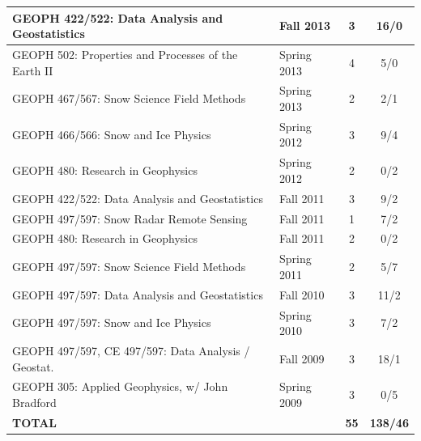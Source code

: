 \documentclass[11pt]{article}
\begin{document}
\begin{table}[!htbp]
\begin{tabular}{|l|l|c|c|}
GEOPH 422/522: Data Analysis and Geostatistics & Fall 2013 & 3 & 16/0 \\ \hline
GEOPH 502: Properties and Processes of the Earth II & Spring 2013 & 4 & 5/0 \\ \hline
GEOPH 467/567: Snow Science Field Methods & Spring 2013 & 2 & 2/1 \\ \hline
GEOPH 466/566: Snow and Ice Physics & Spring 2012 & 3 & 9/4 \\ \hline
GEOPH 480: Research in Geophysics & Spring 2012 & 2 & 0/2 \\ \hline
GEOPH 422/522: Data Analysis and Geostatistics & Fall 2011 & 3 & 9/2 \\ \hline
GEOPH 497/597: Snow Radar Remote Sensing & Fall 2011 & 1 & 7/2 \\ \hline
GEOPH 480: Research in Geophysics & Fall 2011 & 2 & 0/2 \\ \hline
GEOPH 497/597: Snow Science Field Methods & Spring 2011 & 2 & 5/7 \\ \hline
GEOPH 497/597: Data Analysis and Geostatistics & Fall 2010 & 3 & 11/2 \\ \hline
GEOPH 497/597: Snow and Ice Physics & Spring 2010 & 3 & 7/2 \\ \hline
GEOPH 497/597, CE 497/597: Data Analysis / Geostat. & Fall 2009 & 3 & 18/1  \\ \hline
GEOPH 305: Applied Geophysics, w/ John Bradford & Spring 2009 & 3 & 0/5 \\ \hline
\textbf{TOTAL} &  & \textbf{55} & \textbf{138/46} \\ \hline
\end{tabular}
\end{table}

\end{document}

